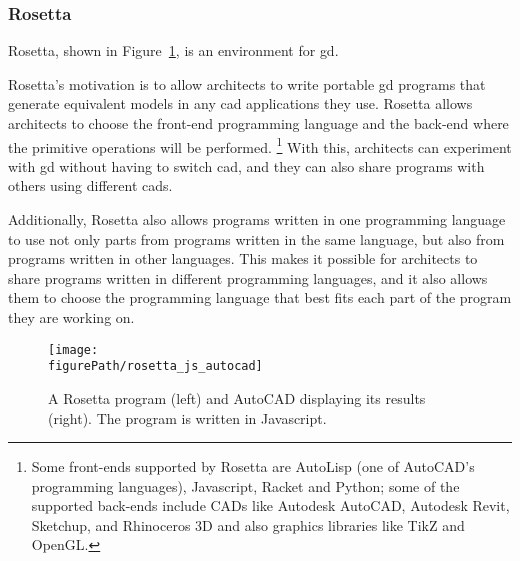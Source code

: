 \subsubsection{Rosetta}
\label{section:rosetta:related}
Rosetta\cite{de2012modern,lopes2011portable}, shown in Figure~\ref{fig:rosetta:ex}, is an environment for \gls{gd}.


Rosetta's motivation is to allow architects to write portable \gls{gd} programs that generate equivalent models in any \gls{cad} applications they use.
Rosetta allows architects to choose the front-end programming language and the back-end where the primitive operations will be performed\cite{de2012modern}.%
\footnote{Some front-ends supported by Rosetta are AutoLisp (one of AutoCAD's programming languages), Javascript, Racket and Python; some of the supported back-ends include CADs like Autodesk AutoCAD, Autodesk Revit, Sketchup, and Rhinoceros 3D and also graphics libraries like TikZ and OpenGL.}
With this, architects can experiment with \gls{gd} without having to switch \gls{cad}, and they can also share programs with others using different \glspl{cad}.

Additionally, Rosetta also allows programs written in one programming language to use not only parts from programs written in the same language, but also from programs written in other languages.
This makes it possible for architects to share programs written in different programming languages, and it also allows them to choose the programming language that best fits each part of the program they are working on.

\begin{figure}
	\centering
	\texttt{[image: \\figurePath/rosetta\_js\_autocad]}
	\caption{A Rosetta program (left) and AutoCAD displaying its results (right). The program is written in Javascript.}
	\label{fig:rosetta:ex}
\end{figure}


